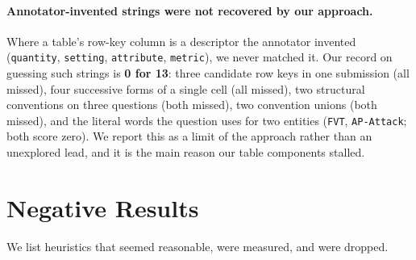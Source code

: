 \documentclass[11pt]{article}
\begin{document}
\paragraph{Annotator-invented strings were not recovered by our approach.}
Where a table's row-key column is a descriptor the annotator invented
(\texttt{quantity}, \texttt{setting}, \texttt{attribute}, \texttt{metric}), we
never matched it. Our record on guessing such strings is \textbf{0 for 13}: three
candidate row keys in one submission (all missed), four successive forms of a
single cell (all missed), two structural conventions on three questions (both
missed), two convention unions (both missed), and the literal words the question
uses for two entities (\texttt{FVT}, \texttt{AP-Attack}; both score zero). We
report this as a limit of the approach rather than an unexplored lead, and it is
the main reason our table components stalled.

\section{Negative Results}
\label{sec:negative}

We list heuristics that seemed reasonable, were measured, and were dropped.
\end{document}
